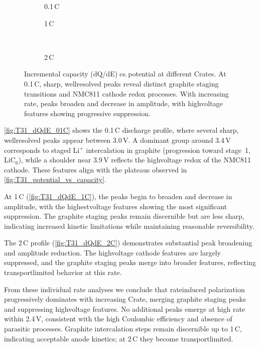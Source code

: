 \begin{figure}[h]
\centering
\begin{subfigure}[b]{0.48\textwidth}
\centering

\caption{0.1\,C}
\label{fig:T31_dQdE_01C}
\end{subfigure}
\hfill
\begin{subfigure}[b]{0.48\textwidth}
\centering

\caption{1\,C}
\label{fig:T31_dQdE_1C}
\end{subfigure}
\\[0.5em]
\begin{subfigure}[b]{0.48\textwidth}
\centering

\caption{2\,C}
\label{fig:T31_dQdE_2C}
\end{subfigure}
\caption{Incremental capacity (dQ/dE)\,\textit{vs.}\,potential at different C\textendash rates. At 0.1\,C, sharp, well\textendash resolved peaks reveal distinct graphite staging transitions and NMC811 cathode redox processes. With increasing rate, peaks broaden and decrease in amplitude, with high\textendash voltage features showing progressive suppression.}
\label{fig:T31_dQdE_all}
\end{figure}

\autoref{fig:T31_dQdE_01C} shows the 0.1\,C discharge profile, where several sharp, well\textendash resolved peaks appear between 3.0\,V. A dominant group around 3.4\,V corresponds to staged Li$^+$ intercalation in graphite (progression toward stage~1, LiC$_6$), while a shoulder near 3.9\,V reflects the high\textendash voltage redox of the NMC811 cathode. These features align with the plateaus observed in \autoref{fig:T31_potential_vs_capacity}.

At 1\,C (\autoref{fig:T31_dQdE_1C}), the peaks begin to broaden and decrease in amplitude, with the highest\textendash voltage features showing the most significant suppression. The graphite staging peaks remain discernible but are less sharp, indicating increased kinetic limitations while maintaining reasonable reversibility.

The 2\,C profile (\autoref{fig:T31_dQdE_2C}) demonstrates substantial peak broadening and amplitude reduction. The high\textendash voltage cathode features are largely suppressed, and the graphite staging peaks merge into broader features, reflecting transport\textendash limited behavior at this rate.

From these individual rate analyses we conclude that rate\textendash induced polarization progressively dominates with increasing C\textendash rate, merging graphite staging peaks and suppressing high\textendash voltage features. No additional peaks emerge at high rate within 2.4\,V, consistent with the high Coulombic efficiency and absence of parasitic processes. Graphite intercalation steps remain discernible up to 1\,C, indicating acceptable anode kinetics; at 2\,C they become transport\textendash limited.

